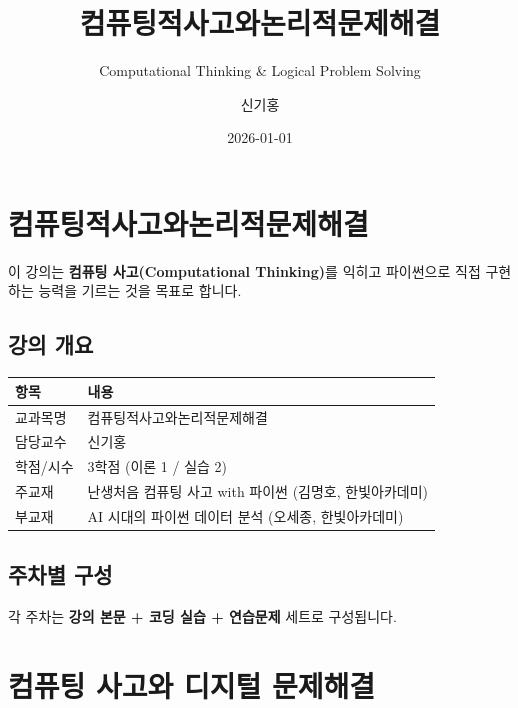 \documentclass[
  korean,
  11pt,
  a4paper,
  DIV=11,
  numbers=noendperiod]{scrreprt}
\title{컴퓨팅적사고와논리적문제해결}
\subtitle{Computational Thinking \& Logical Problem Solving}
\author{신기홍}
\date{2026-01-01}
\newcounter{none} %
\renewcommand*\contentsname{목차}
\newcommand\contentsname{목차}
\begin{document}
\maketitle

\renewcommand*\contentsname{목차}
{
\setcounter{tocdepth}{2}
\tableofcontents
}


\chapter{컴퓨팅적사고와논리적문제해결}\label{uxcef4uxd4e8uxd305uxc801uxc0acuxace0uxc640uxb17cuxb9acuxc801uxbb38uxc81cuxd574uxacb0}

이 강의는 \textbf{컴퓨팅 사고(Computational Thinking)}를 익히고
파이썬으로 직접 구현하는 능력을 기르는 것을 목표로 합니다.

\section{강의 개요}\label{uxac15uxc758-uxac1cuxc694}

{\def\LTcaptype{none} %
\begin{longtable}[]{@{}ll@{}}
\toprule\noalign{}
항목 & 내용 \\
\midrule\noalign{}
\endhead
\bottomrule\noalign{}
\endlastfoot
교과목명 & 컴퓨팅적사고와논리적문제해결 \\
담당교수 & 신기홍 \\
학점/시수 & 3학점 (이론 1 / 실습 2) \\
주교재 & 난생처음 컴퓨팅 사고 with 파이썬 (김명호, 한빛아카데미) \\
부교재 & AI 시대의 파이썬 데이터 분석 (오세종, 한빛아카데미) \\
\end{longtable}
}

\section{주차별 구성}\label{uxc8fcuxcc28uxbcc4-uxad6cuxc131}

각 주차는 \textbf{강의 본문 + 코딩 실습 + 연습문제} 세트로 구성됩니다.


\chapter{컴퓨팅 사고와 디지털 문제해결}\label{sec-ch1}
\end{document}

